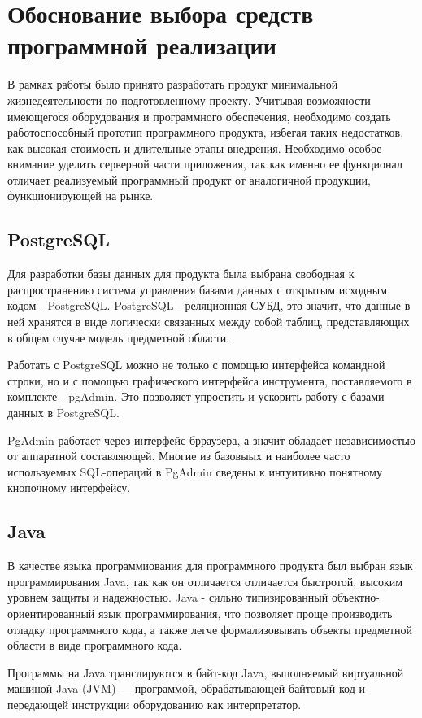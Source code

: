\section{Обоснование выбора средств программной реализации}
В рамках работы было принято разработать продукт минимальной жизнедеятельности по подготовленному проекту. 
Учитывая возможности имеющегося оборудования и программного обеспечения, необходимо создать работоспособный прототип программного продукта, избегая таких недостатков, как высокая стоимость и длительные этапы внедрения.
Необходимо особое внимание уделить серверной части приложения, так как именно ее функционал отличает реализуемый программный продукт от аналогичной продукции, функционирующей на рынке.

\subsection{PostgreSQL}

Для разработки базы данных для продукта была выбрана свободная к распространению система управления базами данных с открытым исходным кодом - PostgreSQL.
PostgreSQL - реляционная СУБД, это значит, что данные в ней хранятся в виде логически связанных между собой таблиц, представляющих в общем случае модель предметной области.

Работать с PostgreSQL можно не только с помощью интерфейса командной строки, но и с помощью графического интерфейса инструмента, поставляемого в комплекте - pgAdmin. 
Это позволяет упростить и ускорить работу с базами данных в PostgreSQL.

PgAdmin работает через интерфейс брраузера, а значит обладает независимостью от аппаратной составляющей.
Многие из базовыых и наиболее часто используемых SQL-операций в PgAdmin сведены к интуитивно понятному кнопочному интерфейсу.

\subsection{Java}

В качестве языка программиования для программного продукта был выбран язык программирования Java, так как он отличается отличается быстротой, высоким уровнем защиты и надежностью.
Java - сильно типизированный объектно-ориентированный язык программирования, что позволяет проще производить отладку программного кода, а также легче формализовывать объекты предметной области в виде программного кода.

Программы на Java транслируются в байт-код Java, выполняемый виртуальной машиной Java (JVM) — программой, обрабатывающей байтовый код и передающей инструкции оборудованию как интерпретатор.


